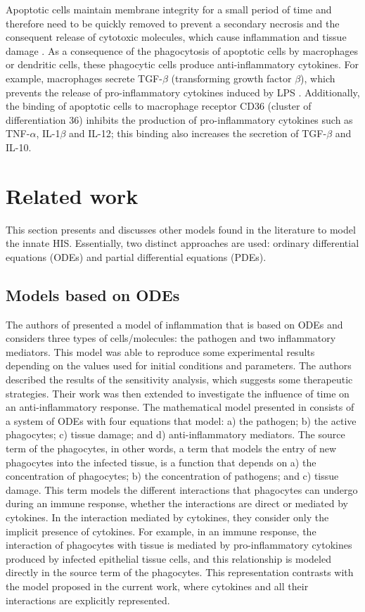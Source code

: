 \documentclass[10pt]{bmc_article}
\newenvironment{bmcformat}{\baselineskip20pt\sloppy\setboolean{publ}{false}}{\baselineskip20pt\sloppy}
\begin{document}
\begin{bmcformat}
Apoptotic cells maintain membrane integrity for a small period of time and therefore need to be quickly removed to prevent a secondary 
necrosis and the consequent release of cytotoxic molecules, which cause inflammation and tissue damage \cite{Kennedy2009}. As a 
consequence of the phagocytosis of apoptotic cells by macrophages or dendritic cells, these phagocytic cells produce anti-inflammatory 
cytokines. For example, macrophages secrete TGF-$\beta$ (transforming growth factor $\beta$), which prevents the release of 
pro-inflammatory cytokines induced by LPS \cite{Lucas2006}. Additionally, the binding of apoptotic cells to macrophage receptor 
CD36 (cluster of differentiation 36) inhibits the production of pro-inflammatory cytokines such as TNF-$\alpha$, IL-1$\beta$ and IL-12; 
this binding also increases the secretion of TGF-$\beta$ and IL-10\cite{Voll1997}. 

\section*{Related work}\label{RelatedWorks}

This section presents and discusses other models found in the literature to model the innate HIS. Essentially, two distinct approaches 
are used: ordinary differential equations (ODEs) and partial differential equations (PDEs). 

\subsection*{Models based on ODEs}

The authors of \cite{Kumar2004} presented a model of inflammation that is based on ODEs and considers three types of cells/molecules: 
the pathogen and two inflammatory mediators. This model was able to reproduce some experimental results depending on the values used 
for initial conditions and parameters. The authors described the results of the sensitivity analysis, which suggests some therapeutic 
strategies. Their work was then extended\cite{reynolds1} to investigate the influence of time on an anti-inflammatory response. The 
mathematical model presented in \cite{reynolds1} consists of a system of ODEs with four equations that model: a) the pathogen; b) the 
active phagocytes; c) tissue damage; and d) anti-inflammatory mediators. The source term of the phagocytes, in other words, a term 
that models the entry of new phagocytes into the infected tissue, is a function that depends on a) the concentration of phagocytes; 
b) the concentration of pathogens; and c) tissue damage. This term models the different interactions that phagocytes can undergo 
during an immune response, whether the interactions are direct or mediated by cytokines. In the interaction mediated by cytokines, 
they consider only the implicit presence of cytokines. For example, in an immune response, the interaction of phagocytes with tissue 
is mediated by pro-inflammatory cytokines produced by infected epithelial tissue cells, and this relationship is modeled directly in 
the source term of the phagocytes. This representation contrasts with the model proposed in the current work, where cytokines and 
all their interactions are explicitly represented. 


\end{bmcformat}
\end{document}
